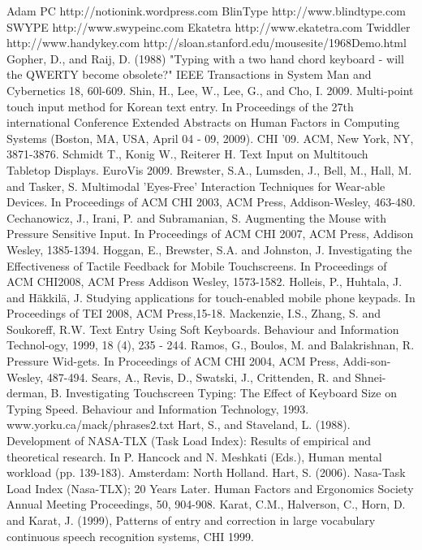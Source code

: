 \documentclass{chi2011}
\begin{document}













\begin{thebibliography}{1}
 Adam PC http://notionink.wordpress.com
 BlinType http://www.blindtype.com
 SWYPE http://www.swypeinc.com
 Ekatetra http://www.ekatetra.com
 Twiddler http://www.handykey.com
 http://sloan.stanford.edu/mousesite/1968Demo.html
 Gopher, D., and Raij, D. (1988) "Typing with a two hand chord keyboard - will the QWERTY become obsolete?" IEEE Transactions in System Man and Cybernetics 18, 60l-609. 
 Shin, H., Lee, W., Lee, G., and Cho, I. 2009. Multi-point touch input method for Korean text entry. In Proceedings of the 27th international Conference Extended Abstracts on Human Factors in Computing Systems (Boston, MA, USA, April 04 - 09, 2009). CHI '09. ACM, New York, NY, 3871-3876.
 Schmidt T., Konig W., Reiterer H. Text Input on Multitouch Tabletop Displays. EuroVis 2009.
 Brewster, S.A., Lumsden, J., Bell, M., Hall, M. and Tasker, S. Multimodal 'Eyes-Free' Interaction Techniques for Wear-able Devices. In Proceedings of ACM CHI 2003, ACM Press, Addison-Wesley, 463-480.
 Cechanowicz, J., Irani, P. and Subramanian, S. Augmenting the Mouse with Pressure Sensitive Input. In Proceedings of ACM CHI 2007, ACM Press, Addison Wesley, 1385-1394.
 Hoggan, E., Brewster, S.A. and Johnston, J. Investigating the Effectiveness of Tactile Feedback for Mobile Touchscreens. In Proceedings of ACM CHI2008, ACM Press Addison Wesley, 1573-1582.
 Holleis, P., Huhtala, J. and Häkkilä, J. Studying applications for touch-enabled mobile phone keypads. In Proceedings of TEI 2008, ACM Press,15-18.
 Mackenzie, I.S., Zhang, S. and Soukoreff, R.W. Text Entry Using Soft Keyboards. Behaviour and Information Technol-ogy, 1999, 18 (4), 235 - 244.
 Ramos, G., Boulos, M. and Balakrishnan, R. Pressure Wid-gets. In Proceedings of ACM CHI 2004, ACM Press, Addi-son-Wesley, 487-494.
 Sears, A., Revis, D., Swatski, J., Crittenden, R. and Shnei-derman, B. Investigating Touchscreen Typing: The Effect of Keyboard Size on Typing Speed. Behaviour and Information Technology, 1993.
 www.yorku.ca/mack/phrases2.txt
 Hart, S., and Staveland, L. (1988). Development of NASA-TLX (Task Load Index): Results of empirical and theoretical research. In P. Hancock and N. Meshkati (Eds.), Human mental workload (pp. 139-183). Amsterdam: North Holland.
 Hart, S. (2006). Nasa-Task Load Index (Nasa-TLX); 20 Years Later. Human Factors and Ergonomics Society Annual Meeting Proceedings, 50, 904-908.
 Karat, C.M., Halverson, C., Horn, D. and Karat, J. (1999), Patterns of entry and correction in large vocabulary continuous speech recognition systems, CHI 1999.

\end{thebibliography}
\end{document}
